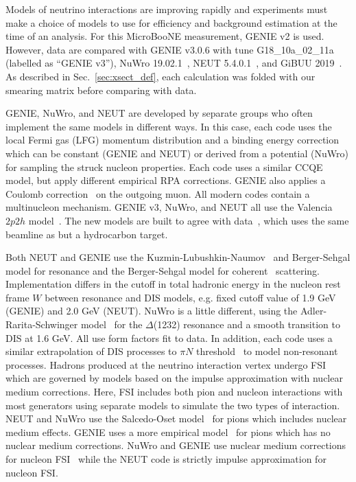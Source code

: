
Models of neutrino interactions are improving rapidly and experiments must make a choice of models to use for efficiency and background estimation at the time of an analysis.  
For this MicroBooNE measurement, GENIE v2 is used.  
However, data are compared with GENIE v3.0.6 with tune G18\_10a\_02\_11a (labelled as ``GENIE v3''), NuWro 19.02.1~\cite{Golan:2012wx}, NEUT 5.4.0.1~\cite{Hayato:2009zz}, and GiBUU 2019~\cite{Buss:2011mx}.  
As described in Sec.~\ref{sec:xsect_def}, each calculation was folded with our smearing matrix before comparing with data.

GENIE, NuWro, and NEUT are developed by separate groups who often implement the same models in different ways.
In this case, each code uses the local Fermi gas (LFG) momentum distribution and a binding energy correction which can be constant (GENIE and NEUT) or derived from a potential (NuWro) for sampling the struck nucleon properties.  
Each code uses a similar CCQE model, but apply different empirical RPA corrections.  
GENIE also applies a Coulomb correction~\cite{Nieves:2004wx} on the outgoing muon.
All modern codes contain a multinucleon mechanism.  
GENIE v3, NuWro, and NEUT all use the Valencia $2p2h$ model~\cite{Gran:2013kda}.
The new models are built to agree with \mb data~\cite{miniboone-ccqe}, which uses the same beamline as \mub but a hydrocarbon target.

Both NEUT and GENIE use the Kuzmin-Lubushkin-Naumov~\cite{Kuzmin:2003ji} and Berger-Sehgal\cite{Berger:2007rqRES} model for  resonance and the Berger-Sehgal model for coherent~\cite{Berger:2008xsCOH} scattering.
Implementation differs in the cutoff in total hadronic energy in the nucleon rest frame $W$ between resonance and DIS models, e.g. fixed cutoff value of 1.9 GeV (GENIE) and 2.0 GeV (NEUT).  NuWro is a little different, using the Adler-Rarita-Schwinger model~\cite{Graczyk:2007xk} for the $\Delta$(1232) resonance and a smooth transition to DIS at 1.6 GeV.
All use form factors fit to data.  
In addition, each code uses a similar extrapolation of DIS processes to $\pi N$ threshold~\cite{Yang:1999xg,Bodek:2002ps} to model non-resonant processes.
Hadrons produced at the neutrino interaction vertex undergo FSI which are governed by models based on the impulse approximation with nuclear medium corrections. Here, FSI includes both pion and nucleon interactions with most generators using separate models to simulate the two types of interaction.
NEUT and NuWro use the Salcedo-Oset model~\cite{Salcedo:1987md} for pions which includes nuclear medium effects.  
GENIE uses a more empirical model~\cite{Katori:2013eoa} for pions which has no nuclear medium corrections.  
NuWro and GENIE use nuclear medium corrections for nucleon FSI~\cite{Pandharipande:1992zz} while the NEUT code is strictly impulse approximation for nucleon FSI.

